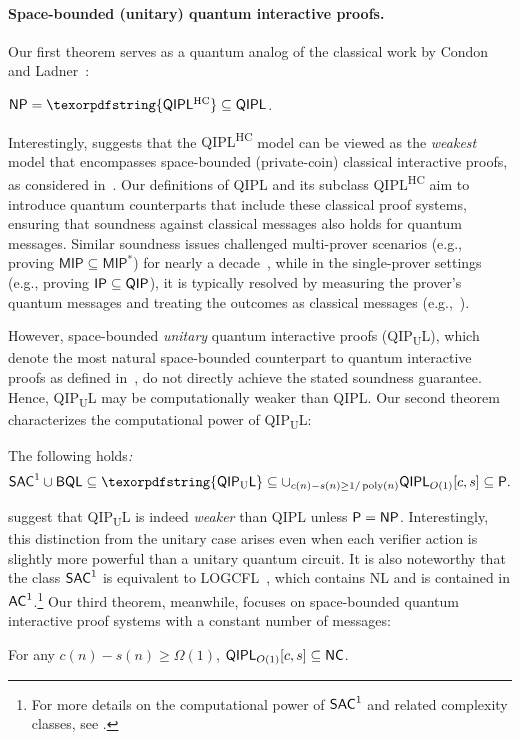 \documentclass[10pt,a4paper]{article}
\numberwithin{equation}{section}
\numberwithin{figure}{section}
\newcommand{\Ptime}{\textnormal{\textsf{P}}\xspace}
\newcommand{\NP}{\textnormal{\textsf{NP}}\xspace}
\newcommand{\IP}{\textnormal{\textsf{IP}}\xspace}
\newcommand{\QIP}{\textnormal{\textsf{QIP}}\xspace}
\newcommand{\QIPL}{\textnormal{\textsf{QIPL}}\xspace}
\newcommand{\QIPUL}{\texorpdfstring{\textnormal{\textsf{QIP}\textsubscript{\textnormal{U}}\textsf{L}}}\xspace}
\newcommand{\QIPLHC}{\texorpdfstring{\textnormal{\textsf{QIPL}\textsuperscript{\textnormal{HC}}}}\xspace}
\newcommand{\BQL}{\textnormal{\textsf{BQL}}\xspace}
\newcommand{\SAC}{\textnormal{\textsf{SAC}}\xspace}
\newcommand{\AC}{\textnormal{\textsf{AC}}\xspace}
\newcommand{\NC}{\textnormal{\textsf{NC}}\xspace}
\newcommand{\NL}{\textnormal{\textsf{NL}}\xspace}
\newcommand{\LOGCFL}{\textnormal{\textsf{LOGCFL}}\xspace}
\DeclareMathOperator\poly{poly}
\begin{document}
\paragraph{Space-bounded (unitary) quantum interactive proofs.} Our first theorem serves as a quantum analog of the classical work by Condon and Ladner~\cite{CL95}:
\begin{theorem}
    \label{thm:QIPL-eq-NP-informal}
    $\NP = \QIPLHC \subseteq \QIPL$.
\end{theorem}

Interestingly,  suggests that the \QIPLHC{} model can be viewed as the \textit{weakest} model that encompasses space-bounded (private-coin) classical interactive proofs, as considered in~\cite{CL95}. Our definitions of \QIPL{} and its subclass \QIPLHC{} aim to introduce quantum counterparts that include these classical proof systems, ensuring that soundness against classical messages also holds for quantum messages. 
Similar soundness issues challenged multi-prover scenarios (e.g., proving $\mathsf{MIP} \subseteq \mathsf{MIP^*}$) for nearly a decade~\cite{CHTW04,IV12}, while in the single-prover settings (e.g., proving $\IP \subseteq \QIP$), it is typically resolved by measuring the prover's quantum messages and treating the outcomes as classical messages (e.g.,~\cite[Claim 1]{AN02}). 

However, space-bounded \textit{unitary} quantum interactive proofs (\QIPUL{}), which denote the most natural space-bounded counterpart to quantum interactive proofs as defined in~\cite{KW00,Wat03}, do not directly achieve the stated soundness guarantee. Hence, \QIPUL{} may be computationally weaker than \QIPL{}. 
Our second theorem characterizes the computational power of \QIPUL{}: 
\begin{theorem}
    \label{thm:QIPUL-bounds-informal} The following holds\emph{:}
    \[\SAC^1 \cup \BQL \subseteq \QIPUL \subseteq \cup_{c(n)-s(n) \geq 1/\poly(n)} \QIPL_{O(1)}[c,s] \subseteq \Ptime.\] 
\end{theorem}

 suggest that \QIPUL{} is indeed \textit{weaker} than \QIPL{} unless $\Ptime = \NP$. Interestingly, this distinction from the unitary case arises even when each verifier action is slightly more powerful than a unitary quantum circuit.
It is also noteworthy that the class $\SAC^1$ is equivalent to \LOGCFL{}~\cite{Venkateswaran87}, which contains \NL{} and is contained in $\AC^1$.\footnote{For more details on the computational power of $\SAC^1$ and related complexity classes, see . }
Our third theorem, meanwhile, focuses on space-bounded quantum interactive proof systems with a constant number of messages: 
\begin{theorem} 
    \label{thm:QIPLconst-informal}
    For any $c(n)-s(n) \geq \Omega(1)$, $\QIPL_{O(1)}[c,s] \subseteq \NC$. 
\end{theorem}
\end{document}
